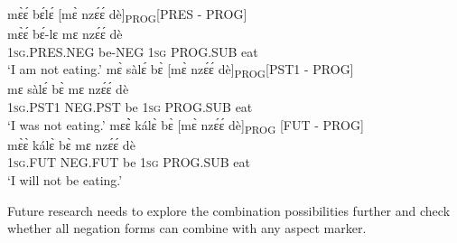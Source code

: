 \begin{exe} 
\ex\label{eneg}
\begin{xlist}
\ex\label{eneg1}
  \glll    mɛ̀ɛ́ bɛ́lɛ́ [mɛ̀ nzɛ́ɛ́ dè]\textsubscript{PROG}\hfill [PRES - PROG]\\
            mɛ̀ɛ́ bɛ́-lɛ mɛ nzɛ́ɛ́ dè \\
             1\textsc{sg}.PRES.NEG be-NEG 1\textsc{sg} PROG.SUB eat    \\
    \trans `I am not eating.'
\ex\label{eneg2}
  \glll   mɛ̀ sàlɛ́ bɛ̀ [mɛ̀ nzɛ́ɛ́ dè]\textsubscript{PROG}\hfill [PST1 - PROG]\\
          mɛ sàlɛ́ bɛ̀ mɛ nzɛ́ɛ́ dè \\
              1\textsc{sg}.PST1 NEG.PST be 1\textsc{sg} PROG.SUB eat   \\
    \trans `I was not eating.'
\ex\label{eneg3}
  \glll   mɛɛ̀̀ kálɛ̀ bɛ̀ [mɛ̀ nzɛ́ɛ́ dè]\textsubscript{PROG} \hfill [FUT - PROG] \\
          mɛ̀ɛ̀ kálɛ̀ bɛ̀ mɛ nzɛ́ɛ́ dè \\
              1\textsc{sg}.FUT NEG.FUT be 1\textsc{sg} PROG.SUB eat   \\
    \trans `I will not be eating.'
\end{xlist}
\end{exe}

\noindent Future research needs to explore the combination possibilities further and check whether all negation forms can combine with any aspect marker.
























